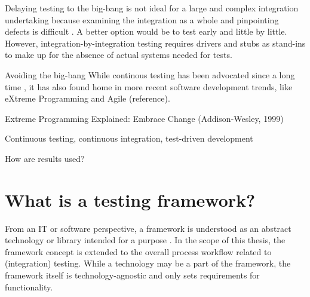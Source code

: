 \documentclass[12pt,a4paper,oneside,pdftex]{report}
\begin{document}
Delaying testing to the big-bang is not ideal for a large and complex integration undertaking because examining the integration as a whole and pinpointing defects is difficult \citep{myers1976software}. A better option would be to test early and little by little. However, integration-by-integration testing requires drivers and stubs as stand-ins to make up for the absence of actual systems needed for tests. 

Avoiding the big-bang 
While continous testing has been advocated since a long time \citep{myers1976software}, it has also found home in more recent software development trends, like eXtreme Programming and Agile (reference).

Extreme Programming Explained: Embrace Change (Addison-Wesley, 1999)

Continuous testing, continuous integration, test-driven development

How are results used?

\section{What is a testing framework?}

From an IT or software perspective, a framework is understood as an abstract technology or library intended for a purpose \citep{johnson1988designing}. In the scope of this thesis, the framework concept is extended to the overall process workflow related to (integration) testing. While a technology may be a part of the framework, the framework itself is technology-agnostic and only sets requirements for functionality. 
\end{document}
